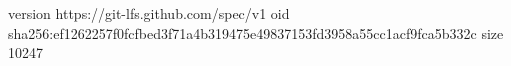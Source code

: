 version https://git-lfs.github.com/spec/v1
oid sha256:ef1262257f0fcfbed3f71a4b319475e49837153fd3958a55cc1acf9fca5b332c
size 10247
